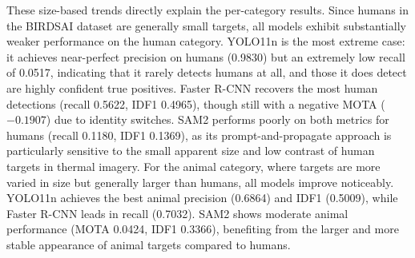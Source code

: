 \documentclass[11pt]{article}
\begin{document}
These size-based trends directly explain the per-category results. 
Since humans in the BIRDSAI dataset are generally small targets, all models exhibit substantially weaker performance on the human category. 
YOLO11n is the most extreme case: it achieves near-perfect precision on humans (0.9830) but an extremely low recall of 0.0517, 
indicating that it rarely detects humans at all, and those it does detect are highly confident true positives. 
Faster R-CNN recovers the most human detections (recall 0.5622, IDF1 0.4965), though still with a negative MOTA ($-0.1907$) due to identity switches. 
SAM2 performs poorly on both metrics for humans (recall 0.1180, IDF1 0.1369), 
as its prompt-and-propagate approach is particularly sensitive to the small apparent size and low contrast of human targets in thermal imagery.
For the animal category, where targets are more varied in size but generally larger than humans, 
all models improve noticeably. YOLO11n achieves the best animal precision (0.6864) and IDF1 (0.5009), 
while Faster R-CNN leads in recall (0.7032). SAM2 shows moderate animal performance (MOTA 0.0424, IDF1 0.3366), 
benefiting from the larger and more stable appearance of animal targets compared to humans.
\end{document}
